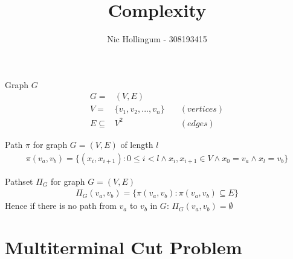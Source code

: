 \documentclass{article}
\author{Nic Hollingum - 308193415}
\title{Complexity}
\begin{document}
\begin{definition}
Graph $G$
\begin{align}
	\nonumber G = & (V,E) \\
	\nonumber V = & \{v_1, v_2, ..., v_n\} \quad & (vertices)\\
	\nonumber E \subseteq & V^2 & (edges)
\end{align}
\end{definition}

\begin{definition}
Path $\pi$ for graph $G = (V,E)$ of length $l$
\begin{align}
	\nonumber \pi(v_a, v_b) = \{(x_i, x_{i+1}) : 0 \leq i < l \wedge x_i, x_{i+1} \in V \wedge x_0 = v_a \wedge x_l = v_b\}
\end{align}
\end{definition}

\begin{definition}
Pathset $\Pi_G$ for graph $G = (V,E)$
\begin{align}
	\nonumber \Pi_G(v_a, v_b) = \{\pi(v_a, v_b) : \pi(v_a, v_b) \subseteq E\}
\end{align}
Hence if there is no path from $v_a$ to $v_b$ in $G$: $\Pi_G(v_a, v_b) = \emptyset$
\end{definition}


\section{Multiterminal Cut Problem}
\end{document}
